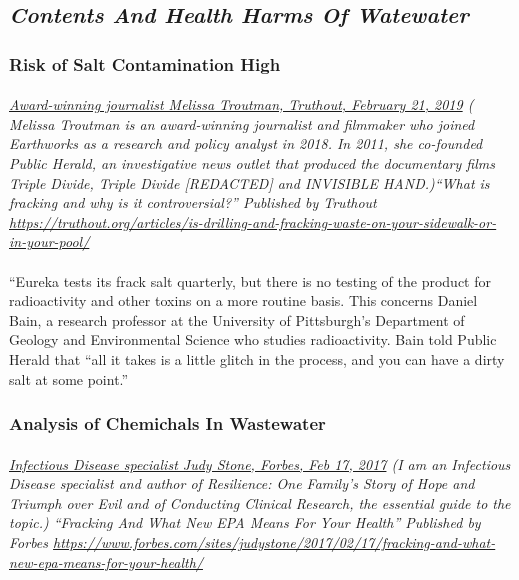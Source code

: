 \documentclass{article}
\begin{document}
\subsection{\emph{Contents And Health Harms Of Watewater}}

\subsubsection{Risk of Salt Contamination High}
\paragraph{}
\small
\textit{
\underline{Award-winning journalist Melissa Troutman, Truthout, February 21, 2019}
( Melissa Troutman is an award-winning journalist and filmmaker who joined Earthworks as a research and policy analyst in 2018. In 2011, she co-founded Public Herald, an investigative news outlet that produced the documentary films Triple Divide, Triple Divide [REDACTED] and INVISIBLE HAND.)``What is fracking and why is it controversial?'' Published by Truthout
\url{https://truthout.org/articles/is-drilling-and-fracking-waste-on-your-sidewalk-or-in-your-pool/}}
\normalsize
\paragraph{}
``Eureka tests its frack salt quarterly, but there is no testing of the product for radioactivity and other toxins on a more routine basis. This concerns Daniel Bain, a research professor at the University of Pittsburgh’s Department of Geology and Environmental Science who studies radioactivity. Bain told Public Herald that “all it takes is a little glitch in the process, and you can have a dirty salt at some point.”

\subsubsection{Analysis of Chemichals In Wastewater}
\paragraph{}
\small
\textit{
\underline{Infectious Disease specialist Judy Stone, Forbes, Feb 17, 2017}
(I am an Infectious Disease specialist and author of Resilience: One Family's Story of Hope and Triumph over Evil and of Conducting Clinical Research, the essential guide to the topic.) ``Fracking And What New EPA Means For Your Health'' Published by Forbes   
\url{https://www.forbes.com/sites/judystone/2017/02/17/fracking-and-what-new-epa-means-for-your-health/}}
\normalsize
\end{document}

